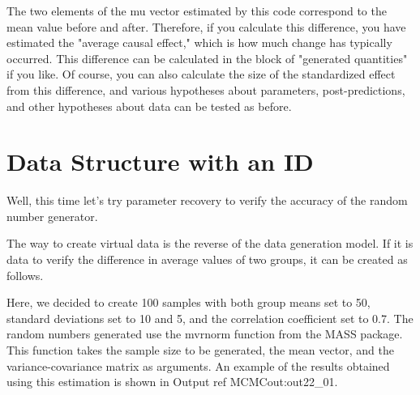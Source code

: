 \documentclass{ltjsbook}
\begin{document}
The two elements of the mu vector estimated by this code correspond to the mean value before and after. Therefore, if you calculate this difference, you have estimated the "average causal effect," which is how much change has typically occurred. This difference can be calculated in the block of "generated quantities" if you like. Of course, you can also calculate the size of the standardized effect from this difference, and various hypotheses about parameters, post-predictions, and other hypotheses about data can be tested as before.

\section{Data Structure with an ID}
Well, this time let's try parameter recovery to verify the accuracy of the random number generator.

The way to create virtual data is the reverse of the data generation model. If it is data to verify the difference in average values of two groups, it can be created as follows.


Here, we decided to create 100 samples with both group means set to 50, standard deviations set to 10 and 5, and the correlation coefficient set to 0.7. The random numbers generated use the mvrnorm function from the MASS package. This function takes the sample size to be generated, the mean vector, and the variance-covariance matrix as arguments. An example of the results obtained using this estimation is shown in Output ref {MCMCout:out22_01}.
\end{document}
